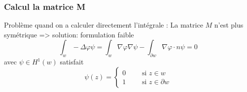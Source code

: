 \begin{frame}
\frametitle{Calcul la matrice M}
Probl\`eme quand on a calculer directement l'int\'egrale : La matrice $M$ n'est plus sym\'etrique
=> solution: formulation faible
\begin{equation}
\int_w -\Delta\varphi \psi =\int_w \nabla\varphi\nabla\psi - \int_{\partial w} \nabla\varphi\cdot n \psi =0
\end{equation}
avec $\psi \in H^1(w)$ satisfait
\begin{equation}
\psi(z) =
\begin{cases}
0 \qquad \text{ si } z\in w \\
1 \qquad \text{ si } z\in \partial w
\end{cases}
\end{equation}


\end{frame}
